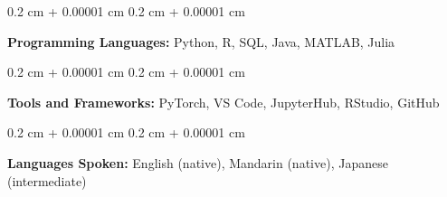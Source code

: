 \documentclass[10pt, letterpaper]{article}
\newenvironment{onecolentry}{
    \begin{adjustwidth}{
        0.2 cm + 0.00001 cm
    }{
        0.2 cm + 0.00001 cm
    }
}{
    \end{adjustwidth}
} %
\begin{document}
        \begin{onecolentry}
            \textbf{Programming Languages:} Python, R, SQL, Java, MATLAB, Julia
        \end{onecolentry}

        \vspace{0.2 cm}

        \begin{onecolentry}
            \textbf{Tools and Frameworks:} PyTorch, VS Code, JupyterHub, RStudio, GitHub
        \end{onecolentry}

        \vspace{0.2cm}
        \begin{onecolentry}
            \textbf{Languages Spoken:} English (native), Mandarin (native), Japanese (intermediate)
        \end{onecolentry}

    
\end{document}

